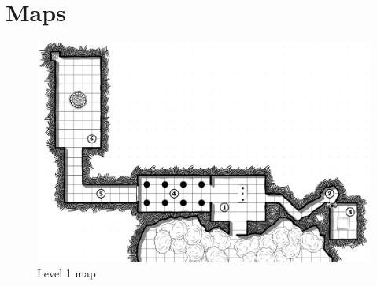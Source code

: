 \chapter{Maps}
\begin{figure}[h]
    \includegraphics[width=\linewidth]{pics/map_level1.png}
    \caption*{Level 1 map}
\end{figure}

\vfill
\pagebreak